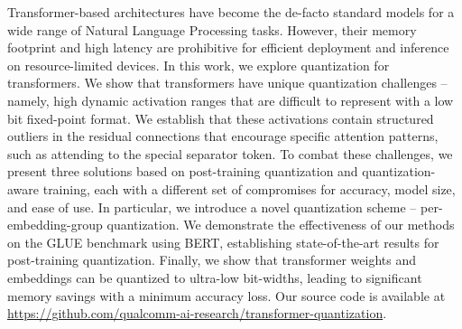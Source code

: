 Transformer-based architectures have become the de-facto standard models for a wide range of Natural Language Processing tasks. However, their memory footprint and high latency are prohibitive for efficient deployment and inference on resource-limited devices. In this work, we explore quantization for transformers. We show that transformers have unique quantization challenges -- namely, high dynamic activation ranges that are difficult to represent with a low bit fixed-point format. We establish that these activations contain structured outliers in the residual connections that encourage specific attention patterns, such as attending to the special separator token. To combat these challenges, we present three solutions based on post-training quantization and quantization-aware training, each with a different set of compromises for accuracy, model size, and ease of use. In particular, we introduce a novel quantization scheme -- per-embedding-group quantization. We demonstrate the effectiveness of our methods on the GLUE benchmark using BERT, establishing state-of-the-art results for post-training quantization. Finally, we show that transformer weights and embeddings can be quantized to ultra-low bit-widths, leading to significant memory savings with a minimum accuracy loss. Our source code is available at \url{https://github.com/qualcomm-ai-research/transformer-quantization}.
